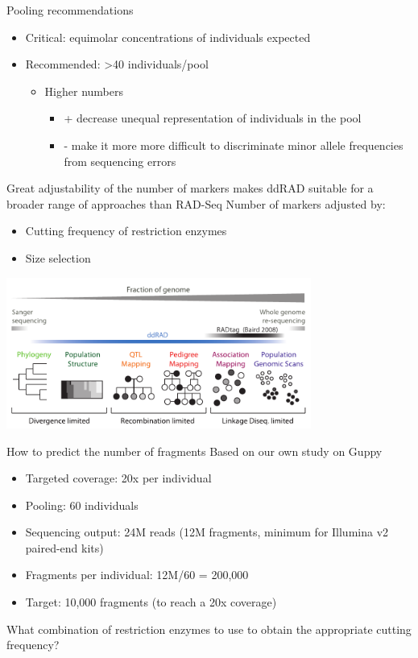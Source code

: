 \documentclass[presentation]{beamer}
\begin{document}
\begin{frame}[label=sec-2-2-4]{Pooling recommendations}
\begin{itemize}
\item Critical: equimolar concentrations of individuals expected
\item Recommended: >40 individuals/pool
\begin{itemize}
\item Higher numbers
\begin{itemize}
\item + decrease unequal representation of individuals in
the pool
\item - make it more more difficult to discriminate minor allele
frequencies from sequencing errors
\end{itemize}
\end{itemize}
\end{itemize}
\end{frame}
\begin{frame}[label=sec-2-2-5]{Great adjustability of the number of markers makes ddRAD suitable for a broader range of approaches than RAD-Seq}
Number of markers adjusted by:
\begin{itemize}
\item Cutting frequency of restriction enzymes
\item Size selection
\end{itemize}
\includegraphics[width=10cm]{Peterson-2012-Fig1.png}   
\begin{center}
\tiny{\citep{Peterson2012}}
\end{center}
\end{frame}
\begin{frame}[label=sec-2-2-6]{How to predict the number of fragments}
Based on our own study on Guppy
\begin{itemize}
\item Targeted coverage: 20x per individual
\item Pooling: 60 individuals
\item Sequencing output: 24M reads (12M fragments, minimum for Illumina v2
paired-end kits)
\item Fragments per individual: 12M/60 = 200,000

\item Target: \alert{10,000} fragments (to reach a 20x coverage)
\end{itemize}

What combination of restriction enzymes to use to obtain the appropriate cutting
frequency?
\end{frame}
\end{document}

